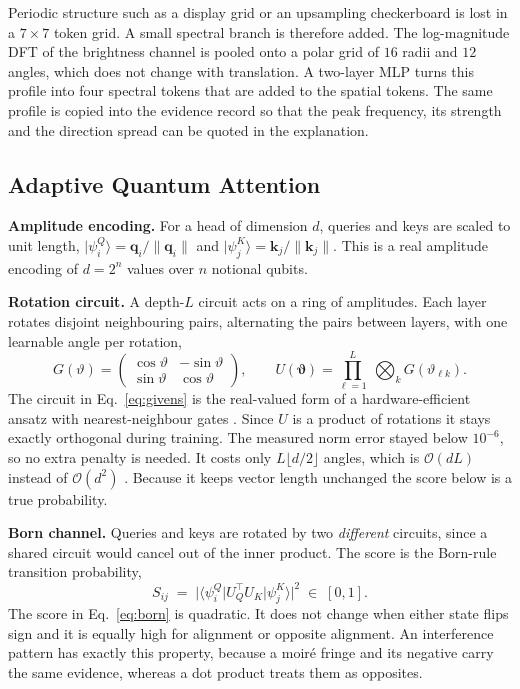 \documentclass[conference]{IEEEtran}
\newcommand{\bs}[1]{\boldsymbol{#1}}
\newcommand{\ket}[1]{\lvert #1 \rangle}
\newcommand{\bra}[1]{\langle #1 \rvert}
\newcommand{\sub}[1]{\subsection{\texorpdfstring{\textbf{#1}}{#1}}}
\begin{document}
Periodic structure such as a display grid or an upsampling checkerboard is lost in a
$7\times7$ token grid. A small spectral branch is therefore added. The log-magnitude
DFT of the brightness channel is pooled onto a polar grid of $16$ radii and $12$
angles, which does not change with translation. A two-layer MLP turns this profile
into four spectral tokens that are added to the spatial tokens. The same profile is
copied into the evidence record so that the peak frequency, its strength and the
direction spread can be quoted in the explanation.

\sub{Adaptive Quantum Attention}
\textbf{Amplitude encoding.} For a head of dimension $d$, queries and keys are scaled
to unit length, $\ket{\psi^{Q}_{i}} = \bs{q}_{i}/\lVert\bs{q}_{i}\rVert$ and
$\ket{\psi^{K}_{j}} = \bs{k}_{j}/\lVert\bs{k}_{j}\rVert$. This is a real amplitude
encoding of $d=2^{n}$ values over $n$ notional qubits.

\textbf{Rotation circuit.} A depth-$L$ circuit acts on a ring of amplitudes. Each layer
rotates disjoint neighbouring pairs, alternating the pairs between layers, with one
learnable angle per rotation,
\begin{equation}
G(\vartheta)=\begin{pmatrix}\cos\vartheta & -\sin\vartheta\\
\sin\vartheta & \cos\vartheta\end{pmatrix},
\qquad
U(\bs{\vartheta})=\prod_{\ell=1}^{L}\ \bigotimes_{k} G(\vartheta_{\ell k}).
\label{eq:givens}
\end{equation}
The circuit in Eq.~\eqref{eq:givens} is the real-valued form of a hardware-efficient
ansatz with nearest-neighbour gates \cite{cherrat2024qvt}. Since $U$ is a product of
rotations it stays exactly orthogonal during training. The measured norm error stayed
below $10^{-6}$, so no extra penalty is needed. It costs only $L\lfloor d/2\rfloor$
angles, which is $\mathcal{O}(dL)$ instead of $\mathcal{O}(d^{2})$
\cite{cherrat2024qvt,evans2025on}. Because it keeps vector length unchanged the score
below is a true probability.

\textbf{Born channel.} Queries and keys are rotated by two \emph{different} circuits,
since a shared circuit would cancel out of the inner product. The score is the
Born-rule transition probability,
\begin{equation}
S_{ij} \;=\; \bigl\lvert \bra{\psi^{Q}_{i}} U_{Q}^{\!\top} U_{K} \ket{\psi^{K}_{j}} \bigr\rvert^{2}
\;\in\;[0,1].
\label{eq:born}
\end{equation}
The score in Eq.~\eqref{eq:born} is quadratic. It does not change when either state
flips sign and it is equally high for alignment or opposite alignment. An interference
pattern has exactly this property, because a moir\'e fringe and its negative carry the
same evidence, whereas a dot product treats them as opposites.
\end{document}
